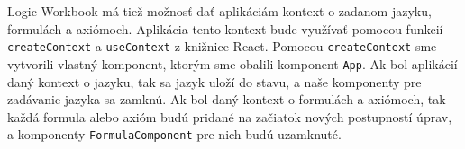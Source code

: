 Logic Workbook má tiež možnosť dať aplikáciám kontext o zadanom jazyku, formulách a axiómoch. Aplikácia tento kontext bude využívať pomocou funkcií \texttt{createContext} a \texttt{useContext} z knižnice React. Pomocou \texttt{createContext} sme vytvorili vlastný komponent, ktorým sme obalili komponent \texttt{App}. Ak bol aplikácií daný kontext o jazyku, tak sa jazyk uloží do stavu, a naše komponenty pre zadávanie jazyka sa zamknú. Ak bol daný kontext o formulách a axiómoch, tak každá formula alebo axióm budú pridané na začiatok nových postupností úprav, a komponenty \texttt{FormulaComponent} pre nich budú uzamknuté.







